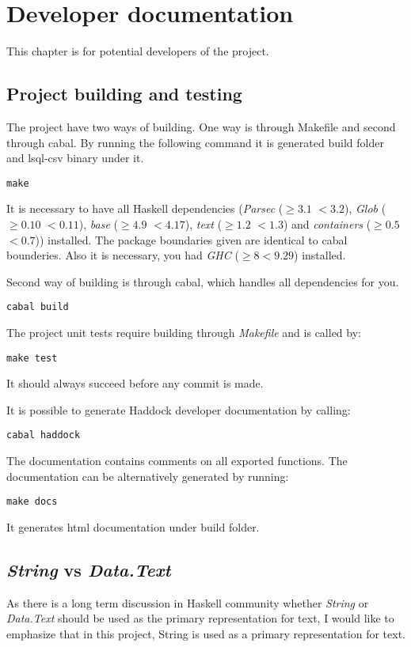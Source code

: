 \chapter{Developer documentation}
This chapter is for potential developers of the project.

\section{Project building and testing}
The project have two ways of building. One way is through Makefile and second through cabal. 
By running the following command it is generated build folder and lsql-csv binary under it.
\begin{verbatim}
make
\end{verbatim}
 
It is necessary to have all Haskell dependencies (\textit{Parsec} ($\geq 3.1$ $<3.2$), \textit{Glob} ($\geq 0.10$ $<0.11$), 
\textit{base} ($\geq 4.9$ $<4.17$), \textit{text} ($\geq 1.2$ $<1.3$) and \textit{containers} ($\geq 0.5$ $<0.7$)) installed.
The package boundaries given are identical to cabal bounderies. Also it is necessary, you had \textit{GHC} ($\geq 8 <9.29$) installed.

Second way of building is through cabal, which handles all dependencies for you.

\begin{verbatim}
cabal build
\end{verbatim}


The project unit tests require building through \textit{Makefile} and is called by:
\begin{verbatim}
make test
\end{verbatim}
It should always succeed before any commit is made.

It is possible to generate Haddock developer documentation by calling:
\begin{verbatim}
cabal haddock
\end{verbatim}

The documentation contains comments on all exported functions. The documentation can be alternatively generated
by running:

\begin{verbatim}
make docs
\end{verbatim}
It generates html documentation under build folder.

\section{\textit{String} vs \textit{Data.Text}}
As there is a long term discussion in Haskell community whether \textit{String} or \textit{Data.Text} should be used as the 
primary representation for text, I would like to emphasize that in this project, String is used as a primary
representation for text.

